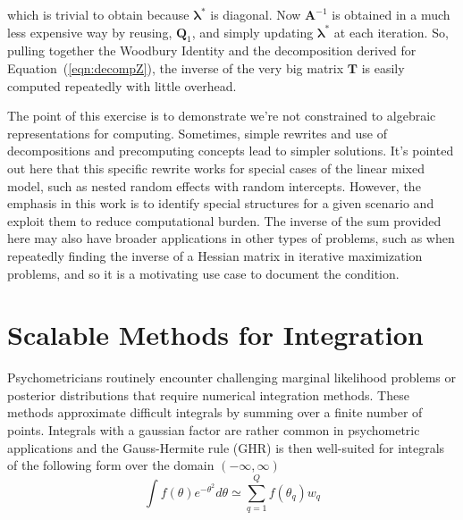 \documentclass[12pt]{article}
\begin{document}
\noindent which is trivial to obtain because $\bm{\lambda}^{*}$ is diagonal.  Now $\bm{A}^{-1}$ is obtained in a much less expensive way by reusing, $\bm{Q}_1$, and simply updating $\bm{\lambda}^*$ at each iteration. So, pulling together the Woodbury Identity and the decomposition derived for Equation~(\ref{eqn:decompZ}), the inverse of the very big matrix $\bm{T}$ is easily computed repeatedly with little overhead.

The point of this exercise is to demonstrate we're not constrained to algebraic representations for computing. Sometimes, simple rewrites and use of decompositions and precomputing concepts lead to simpler solutions. It's pointed out here that this specific rewrite works for special cases of the linear mixed model, such as nested random effects with random intercepts. However, the emphasis in this work is to identify special structures for a given scenario and exploit them to reduce computational burden. The inverse of the sum provided here may also have broader applications in other types of problems, such as when repeatedly finding the inverse of a Hessian matrix in iterative maximization problems, and so it is a motivating use case to document the condition. 

\section*{Scalable Methods for Integration}

Psychometricians routinely encounter challenging marginal likelihood problems or posterior distributions that require numerical integration methods. These methods approximate difficult integrals by summing over a finite number of points. Integrals with a gaussian factor are rather common in psychometric applications and the Gauss-Hermite rule (GHR) is then well-suited for integrals of the following form over the domain $(-\infty,\infty)$
\begin{equation}
\label{eqn:integral}
\int f(\theta)e^{-\theta^2} d\theta \simeq \sum_{q=1}^Q f(\theta_q)w_q
\end{equation}
\end{document}

